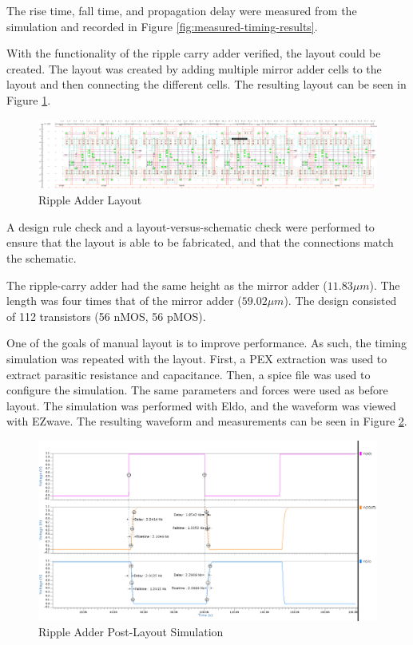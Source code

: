\documentclass[11pt]{article}
\begin{document}
	The rise time, fall time, and propagation delay were measured from the simulation and recorded in Figure \ref{fig:measured-timing-results}. 
	
	With the functionality of the ripple carry adder verified, the layout could be created. The layout was created by adding multiple mirror adder cells to the layout and then connecting the different cells. The resulting layout can be seen in Figure \ref{fig:ripple-adder-layout}.

	\begin{figure}[H]
		\centering
		\includegraphics[width=1\linewidth]{"Pictures/Ripple Adder Layout"}
		\caption{Ripple Adder Layout}
		\label{fig:ripple-adder-layout}
	\end{figure}

	A design rule check and a layout-versus-schematic check were performed to ensure that the layout is able to be fabricated, and that the connections match the schematic. 
	
	The ripple-carry adder had the same height as the mirror adder ($11.83\mu m$). The length was four times that of the mirror adder ($59.02\mu m$). The design consisted of 112 transistors (56 nMOS, 56 pMOS).
	
	One of the goals of manual layout is to improve performance. As such, the timing simulation was repeated with the layout. First, a PEX extraction was used to extract parasitic resistance and capacitance. Then, a spice file was used to configure the simulation. The same parameters and forces were used as before layout. The simulation was performed with Eldo, and the waveform was viewed with EZwave. The resulting waveform and measurements can be seen in Figure \ref{fig:post-layout-simulation}.

	\begin{figure}[H]
		\centering
		\includegraphics[width=1\linewidth]{"Pictures/Post-Layout Simulation"}
		\caption{Ripple Adder Post-Layout Simulation}
		\label{fig:post-layout-simulation}
	\end{figure}
\end{document}
